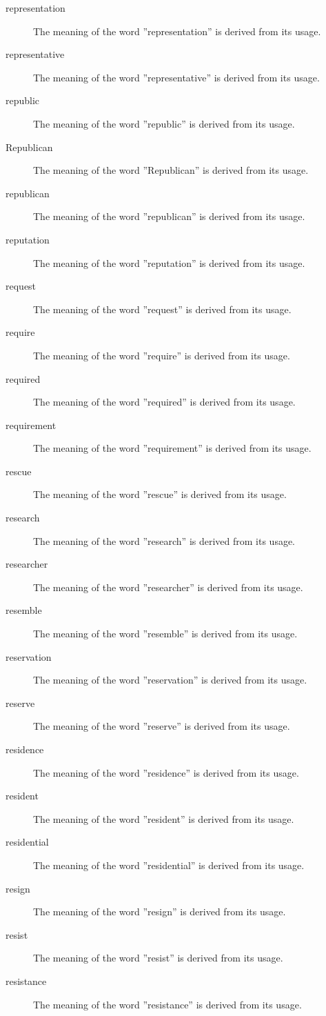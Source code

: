\documentclass[12pt, letterpaper]{memoir}
\begin{document}
\begin{description}
\item[representation] The meaning of the word ''representation'' is derived from its usage.
\item[representative] The meaning of the word ''representative'' is derived from its usage.
\item[republic] The meaning of the word ''republic'' is derived from its usage.
\item[Republican] The meaning of the word ''Republican'' is derived from its usage.
\item[republican] The meaning of the word ''republican'' is derived from its usage.
\item[reputation] The meaning of the word ''reputation'' is derived from its usage.
\item[request] The meaning of the word ''request'' is derived from its usage.
\item[require] The meaning of the word ''require'' is derived from its usage.
\item[required] The meaning of the word ''required'' is derived from its usage.
\item[requirement] The meaning of the word ''requirement'' is derived from its usage.
\item[rescue] The meaning of the word ''rescue'' is derived from its usage.
\item[research] The meaning of the word ''research'' is derived from its usage.
\item[researcher] The meaning of the word ''researcher'' is derived from its usage.
\item[resemble] The meaning of the word ''resemble'' is derived from its usage.
\item[reservation] The meaning of the word ''reservation'' is derived from its usage.
\item[reserve] The meaning of the word ''reserve'' is derived from its usage.
\item[residence] The meaning of the word ''residence'' is derived from its usage.
\item[resident] The meaning of the word ''resident'' is derived from its usage.
\item[residential] The meaning of the word ''residential'' is derived from its usage.
\item[resign] The meaning of the word ''resign'' is derived from its usage.
\item[resist] The meaning of the word ''resist'' is derived from its usage.
\item[resistance] The meaning of the word ''resistance'' is derived from its usage.

\end{description}
\end{document}
